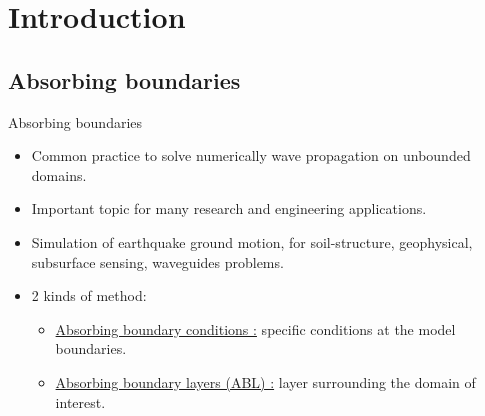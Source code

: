 \section{Introduction}
\subsection{Absorbing boundaries}
\begin{frame}{Absorbing boundaries}
    \begin{itemize}[<+->]
        \item Common practice to solve numerically wave propagation on unbounded domains.
        \item Important topic for many research and engineering applications.
        \item Simulation of earthquake ground motion, for soil-structure, geophysical, subsurface sensing, waveguides problems.
        \pause
        \vspace{0.7cm}
        \item 2 kinds of method:
        \begin{itemize}
            \item \underline{Absorbing boundary conditions :} specific conditions at the model boundaries.
        \pause
            \item \underline{Absorbing boundary layers (ABL) :} layer surrounding the domain of interest.
        \end{itemize}    
    \end{itemize}
\end{frame}

